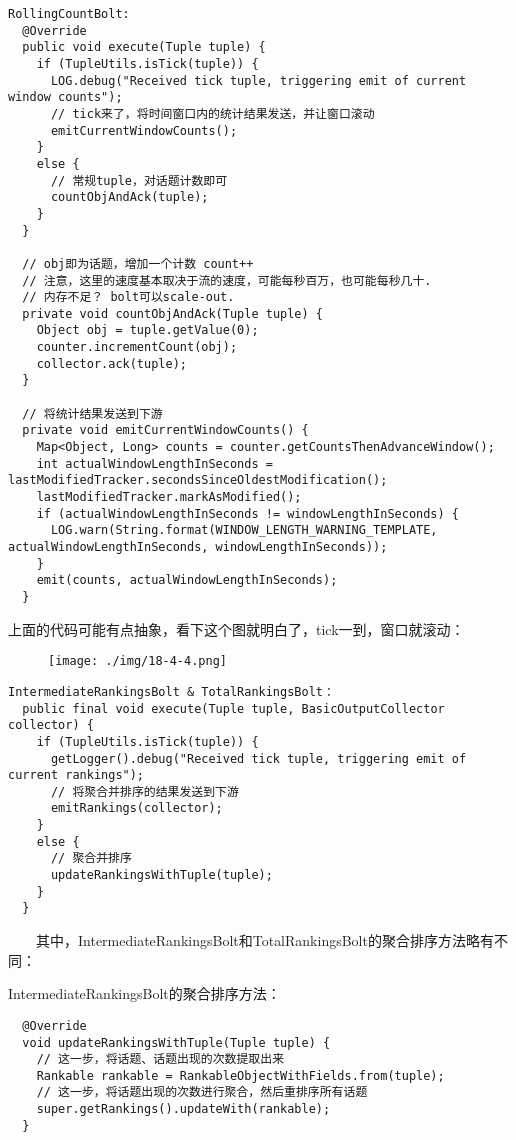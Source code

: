 \begin{verbatim}
RollingCountBolt:
  @Override
  public void execute(Tuple tuple) {
    if (TupleUtils.isTick(tuple)) {
      LOG.debug("Received tick tuple, triggering emit of current window counts");
      // tick来了，将时间窗口内的统计结果发送，并让窗口滚动
      emitCurrentWindowCounts();
    }
    else {
      // 常规tuple，对话题计数即可
      countObjAndAck(tuple);
    }
  }

  // obj即为话题，增加一个计数 count++
  // 注意，这里的速度基本取决于流的速度，可能每秒百万，也可能每秒几十.
  // 内存不足？ bolt可以scale-out.
  private void countObjAndAck(Tuple tuple) {
    Object obj = tuple.getValue(0);
    counter.incrementCount(obj);
    collector.ack(tuple);
  }
  
  // 将统计结果发送到下游
  private void emitCurrentWindowCounts() {
    Map<Object, Long> counts = counter.getCountsThenAdvanceWindow();
    int actualWindowLengthInSeconds = lastModifiedTracker.secondsSinceOldestModification();
    lastModifiedTracker.markAsModified();
    if (actualWindowLengthInSeconds != windowLengthInSeconds) {
      LOG.warn(String.format(WINDOW_LENGTH_WARNING_TEMPLATE, actualWindowLengthInSeconds, windowLengthInSeconds));
    }
    emit(counts, actualWindowLengthInSeconds);
  }
\end{verbatim}

上面的代码可能有点抽象，看下这个图就明白了，tick一到，窗口就滚动：

\begin{figure}
\centering
\texttt{[image: ./img/18-4-4.png]}
\caption{}
\end{figure}

\begin{verbatim}
IntermediateRankingsBolt & TotalRankingsBolt：
  public final void execute(Tuple tuple, BasicOutputCollector collector) {
    if (TupleUtils.isTick(tuple)) {
      getLogger().debug("Received tick tuple, triggering emit of current rankings");
      // 将聚合并排序的结果发送到下游
      emitRankings(collector);
    }
    else {
      // 聚合并排序
      updateRankingsWithTuple(tuple);
    }
  }
\end{verbatim}

  其中，IntermediateRankingsBolt和TotalRankingsBolt的聚合排序方法略有不同：

IntermediateRankingsBolt的聚合排序方法：

\begin{verbatim}
  @Override
  void updateRankingsWithTuple(Tuple tuple) {
    // 这一步，将话题、话题出现的次数提取出来
    Rankable rankable = RankableObjectWithFields.from(tuple);
    // 这一步，将话题出现的次数进行聚合，然后重排序所有话题
    super.getRankings().updateWith(rankable);
  }
\end{verbatim}

